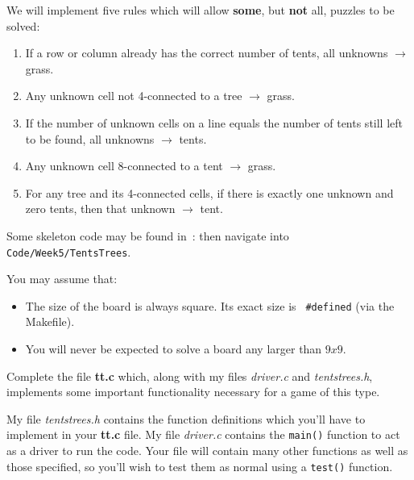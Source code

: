 \begin{exercise}

We will implement five rules which will allow {\bf some}, but {\bf not}
all, puzzles to be solved:

\begin{enumerate}

\item If a row or column already has the correct number of tents, all
unknowns $\rightarrow$ grass.

\item Any unknown cell not 4-connected to a tree $\rightarrow$ grass.

\item If the number of unknown cells on a line equals the number of tents still left to be found,
all unknowns $\rightarrow$ tents.

\item Any unknown cell 8-connected to a tent $\rightarrow$ grass.

\item For any tree and its 4-connected cells, if there is exactly one
unknown and zero tents, then that unknown $\rightarrow$ tent.

\end{enumerate}

\noindent Some skeleton code may be found in~:
 \noindent then navigate
into \verb^Code/Week5/TentsTrees^.

You may assume that:
\begin{itemize}

\item The size of the board is always square. Its exact size is {\tt
\#defined} (via the Makefile).

\item You will never be expected to solve a board any larger than $9x9$.
\end{itemize}

Complete the file {\bf tt.c} which, along with
my files {\em driver.c} and {\em tentstrees.h}, implements some important
functionality necessary for a game of this type.

\noindent My file {\em tentstrees.h} contains the function definitions
which you'll have to implement in your {\bf tt.c} file. My file
{\em driver.c} contains the \verb^main()^ function to act as a driver to
run the code. Your file will contain many other functions as well as those
specified, so you'll wish to test them as normal using a \verb^test()^
function.


\end{exercise}
